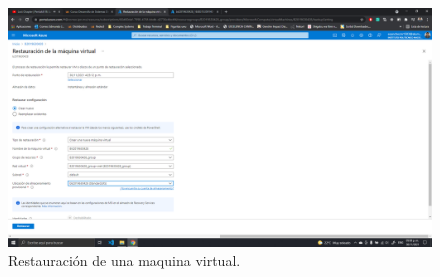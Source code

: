 \documentclass[11pt]{article}
\begin{document}
		 \begin{figure}[H]
			\centering
			\includegraphics[scale=0.34]{resources/3.6-9.png}
			\caption{Restauración de una maquina virtual.}\label{fig:picture}
		\end{figure}
\end{document}
